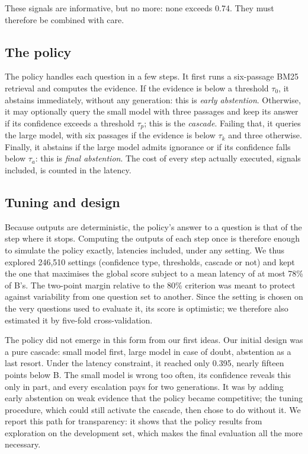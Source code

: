 \documentclass[11pt,a4paper]{article}
\begin{document}
These signals are informative, but no more: none exceeds 0.74. They must therefore be combined with care.

\subsection{The policy}

The policy handles each question in a few steps. It first runs a six-passage BM25 retrieval and computes
the evidence. If the evidence is below a threshold $\tau_0$, it abstains immediately, without any
generation: this is \emph{early abstention}. Otherwise, it may optionally query the small model with
three passages and keep its answer if its confidence exceeds a threshold $\tau_p$; this is the
\emph{cascade}. Failing that, it queries the large model, with six passages if the evidence is below
$\tau_k$ and three otherwise. Finally, it abstains if the large model admits ignorance or if its
confidence falls below $\tau_a$: this is \emph{final abstention}. The cost of every step actually
executed, signals included, is counted in the latency.

\subsection{Tuning and design}

Because outputs are deterministic, the policy's answer to a question is that of the step where it stops.
Computing the outputs of each step once is therefore enough to simulate the policy exactly, latencies
included, under any setting. We thus explored 246,510 settings (confidence type, thresholds, cascade or
not) and kept the one that maximises the global score subject to a mean latency of at most 78\% of B's.
The two-point margin relative to the 80\% criterion was meant to protect against variability from one
question set to another. Since the setting is chosen on the very questions used to evaluate it, its
score is optimistic; we therefore also estimated it by five-fold cross-validation.

The policy did not emerge in this form from our first ideas. Our initial design was a pure cascade:
small model first, large model in case of doubt, abstention as a last resort. Under the latency
constraint, it reached only 0.395, nearly fifteen points below B. The small model is wrong too often,
its confidence reveals this only in part, and every escalation pays for two generations. It was by
adding early abstention on weak evidence that the policy became competitive; the tuning procedure, which
could still activate the cascade, then chose to do without it. We report this path for transparency: it
shows that the policy results from exploration on the development set, which makes the final evaluation
all the more necessary.
\end{document}
